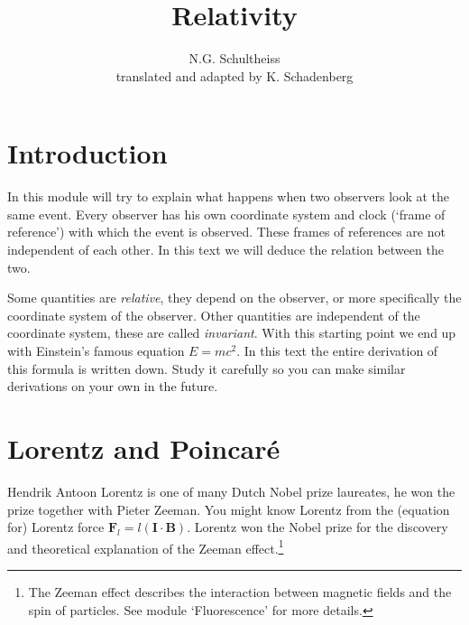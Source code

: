 \documentclass[12pt,a4paper]{article}
\author{N.G. Schultheiss \\ translated and adapted by K. Schadenberg}
\date{}
\title{Relativity}
\numberwithin{equation}{section}
\numberwithin{figure}{section}
\numberwithin{table}{section}
\begin{document}
\maketitle

\section{Introduction}
In this module will try to explain what happens when two observers look at the same event. Every observer has his own coordinate system and clock (`frame of reference') with which the event is observed. These frames of references are not independent of each other. In this text we will deduce the relation between the two.

Some quantities are \textit{relative}, they depend on the observer, or more specifically the coordinate system of the observer. Other quantities are independent of the coordinate system, these are called \textit{invariant}. With this starting point we end up with Einstein's famous equation $E=mc^2$. In this text the entire derivation of this formula is written down. Study it carefully so you can make similar derivations on your own in the future.

\section{Lorentz and Poincar\'e}
Hendrik Antoon Lorentz is one of many Dutch Nobel prize laureates, he won the prize together with Pieter Zeeman. You might know Lorentz from the (equation for) Lorentz force $\textbf{F}_l = l(\textbf{I} \cdot \textbf{B})$. Lorentz won the Nobel prize for the discovery and theoretical explanation of the Zeeman effect.\footnote{The Zeeman effect describes the interaction between magnetic fields and the spin of particles. See module `Fluorescence' for more details.}
\end{document}
